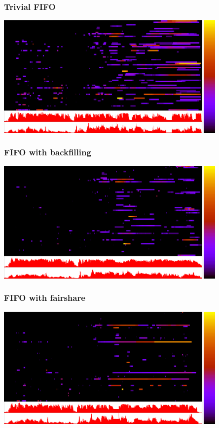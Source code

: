 \begin{frame}
	\frametitle{Trivial FIFO}
	\begin{center}
	\includegraphics[width=0.85\textwidth]{none_fifo.png}
	\end{center}
\end{frame}

\begin{frame}
	\frametitle{FIFO with backfilling}
	\begin{center}
	\includegraphics[width=0.85\textwidth]{none_backfill.png}
	\end{center}
\end{frame}

\begin{frame}
	\frametitle{FIFO with fairshare}
	\begin{center}
	\includegraphics[width=0.85\textwidth]{max_fifo.png}
	\end{center}
\end{frame}

